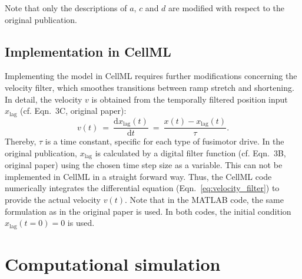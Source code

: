 \documentclass[fleqn,10pt]{physiome}
\begin{document}
%
Note that only the descriptions of $a$, $c$ and $d$ are modified with respect to the original publication.
%
\subsection{Implementation in CellML}\label{sec:mod_cellml}
Implementing the model in CellML requires further modifications concerning the velocity filter, which smoothes transitions between ramp stretch and shortening. In detail, the velocity $v$ is obtained from the temporally filtered position input $x_\mathrm{lag}$ (cf. Eqn.~3C, original paper): 
%
\begin{equation}
v(t) \  = \ \frac{{\mathrm d} x_\mathrm{lag}(t)}{{\mathrm d}t} \ = \ \frac{x(t)-x_\mathrm{lag}(t)}{\tau}.
\label{eq:velocity_filter}
\end{equation}
%
Thereby, $\tau$ is a time constant, specific for each type of fusimotor drive. 
In the original publication, $x_\mathrm{lag}$ is calculated by a digital filter function (cf. Eqn.~3B, original paper) using the chosen time step size as a variable. This can not be implemented in CellML in a straight forward way. 
Thus, the CellML code numerically integrates the differential equation (Eqn.~\ref{eq:velocity_filter}) to provide the actual velocity $v(t)$. Note that in the MATLAB code, the same formulation as in the original paper is used. In both codes, the initial condition $x_\mathrm{lag}(t=0) = 0$ is used.


\section{Computational simulation}
\end{document}
